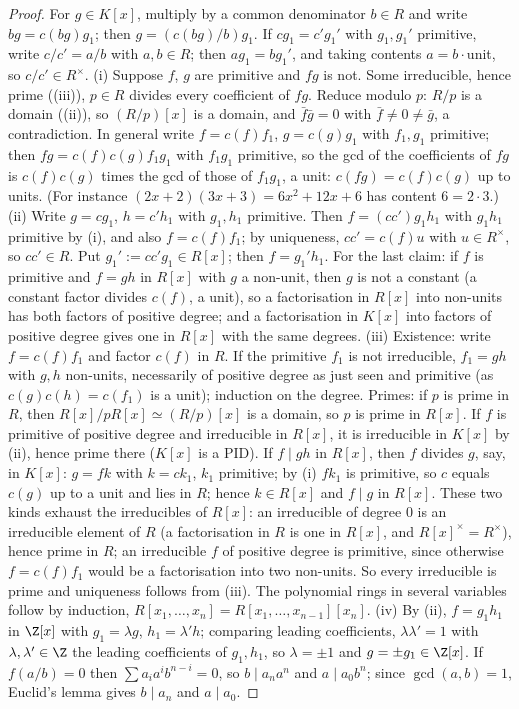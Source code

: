 \begin{proof}
For $g\in K[x]$, multiply by a common denominator $b\in R$ and write $bg=c(bg)g_1$; then $g=(c(bg)/b)g_1$. If $cg_1=c'g_1'$ with $g_1,g_1'$
primitive, write $c/c'=a/b$ with $a,b\in R$; then $ag_1=bg_1'$, and taking contents $a=b\cdot$unit, so $c/c'\in R^\times$.
(i) Suppose $f$, $g$ are primitive and $fg$ is not. Some irreducible, hence prime ((iii)), $p\in R$
divides every coefficient of $fg$. Reduce modulo $p$: $R/p$ is a domain ((ii)), so $(R/p)[x]$ is a
domain, and $\bar f\bar g=0$ with $\bar f\ne0\ne\bar g$, a contradiction. In general write $f=c(f)f_1$, $g=c(g)g_1$ with $f_1,g_1$ primitive; then
$fg=c(f)c(g)f_1g_1$ with $f_1g_1$ primitive, so the gcd of the coefficients of $fg$ is $c(f)c(g)$ times the gcd of those of $f_1g_1$, a unit:
$c(fg)=c(f)c(g)$ up to units. (For instance $(2x+2)(3x+3)=6x^2+12x+6$ has content $6=2\cdot3$.)
(ii) Write $g=cg_1$, $h=c'h_1$ with $g_1,h_1$ primitive. Then $f=(cc')g_1h_1$ with $g_1h_1$ primitive by (i), and also $f=c(f)f_1$; by
uniqueness, $cc'=c(f)u$ with $u\in R^\times$, so $cc'\in R$. Put $g_1':=cc'g_1\in R[x]$; then $f=g_1'h_1$. For the last claim: if $f$ is primitive and
$f=gh$ in $R[x]$ with $g$ a non-unit, then $g$ is not a constant (a constant factor divides $c(f)$, a unit), so a factorisation in $R[x]$
into non-units has both factors of positive degree; and a factorisation in $K[x]$ into factors of positive degree gives one in
$R[x]$ with the same degrees.
(iii) Existence: write $f=c(f)f_1$ and factor $c(f)$ in $R$. If the primitive $f_1$ is not irreducible, $f_1=gh$ with $g,h$ non-units,
necessarily of positive degree as just seen and primitive (as $c(g)c(h)=c(f_1)$ is a unit); induction on the degree. Primes: if $p$
is prime in $R$, then $R[x]/pR[x]\simeq(R/p)[x]$ is a domain, so $p$ is prime in $R[x]$. If $f$ is primitive of positive degree and
irreducible in $R[x]$, it is irreducible in $K[x]$ by (ii), hence prime there ($K[x]$ is a PID). If $f\mid gh$ in $R[x]$, then $f$ divides $g$,
say, in $K[x]$: $g=fk$ with $k=ck_1$, $k_1$ primitive; by (i) $fk_1$ is primitive, so $c$ equals $c(g)$ up to a unit and lies in $R$; hence
$k\in R[x]$ and $f\mid g$ in $R[x]$. These two kinds exhaust the irreducibles of $R[x]$: an irreducible of degree $0$ is an irreducible
element of $R$ (a factorisation in $R$ is one in $R[x]$, and $R[x]^\times=R^\times$), hence prime in $R$; an irreducible $f$ of positive degree
is primitive, since otherwise $f=c(f)f_1$ would be a factorisation into two non-units. So every irreducible is prime and uniqueness
follows from (iii). The polynomial rings in several variables follow by induction,
$R[x_1,\dots,x_n]=R[x_1,\dots,x_{n-1}][x_n]$.
(iv) By (ii), $f=g_1h_1$ in $\Z[x]$ with $g_1=\lambda g$, $h_1=\lambda'h$; comparing leading coefficients, $\lambda\lambda'=1$ with $\lambda,\lambda'\in\Z$ the leading
coefficients of $g_1,h_1$, so $\lambda=\pm1$ and $g=\pm g_1\in\Z[x]$. If $f(a/b)=0$ then $\sum a_ia^ib^{n-i}=0$, so $b\mid a_na^n$ and $a\mid a_0b^n$; since
$\gcd(a,b)=1$, Euclid's lemma gives $b\mid a_n$ and $a\mid a_0$.
\end{proof}

